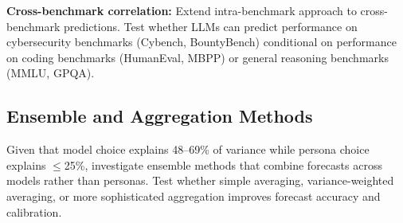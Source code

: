 \documentclass[midterm]{sparreport}
\begin{document}
\textbf{Cross-benchmark correlation:} Extend intra-benchmark approach to cross-benchmark predictions. Test whether LLMs can predict performance on cybersecurity benchmarks (Cybench, BountyBench) conditional on performance on coding benchmarks (HumanEval, MBPP) or general reasoning benchmarks (MMLU, GPQA).

\subsection{Ensemble and Aggregation Methods}

Given that model choice explains 48--69\% of variance while persona choice explains $\leq$25\%, investigate ensemble methods that combine forecasts across models rather than personas. Test whether simple averaging, variance-weighted averaging, or more sophisticated aggregation improves forecast accuracy and calibration.



\end{document}
